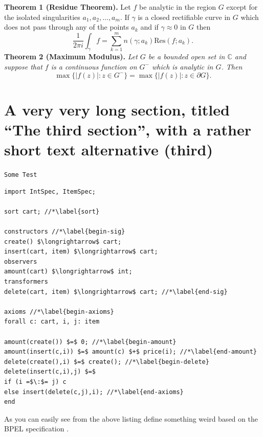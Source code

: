 \documentclass[mscthesis]{usiinfthesis}
\begin{document}
\textbf{Theorem 1 (Residue Theorem).}
Let $f$ be analytic in the region $G$ except for the isolated singularities $a_1,a_2,\ldots,a_m$. If $\gamma$ is a closed rectifiable curve in $G$ which does not pass through any of the points $a_k$ and if $\gamma\approx 0$ in $G$ then
\[
\frac{1}{2\pi i}\int_\gamma f = \sum_{k=1}^m n(\gamma;a_k) \text{Res}(f;a_k).
\]
\textbf{Theorem 2 (Maximum Modulus).}
\emph{Let $G$ be a bounded open set in $\mathbb{C}$ and suppose that $f$ is a continuous function on $G^-$ which is analytic in $G$. Then}
\[
\max\{|f(z)|:z\in G^-\}=\max \{|f(z)|:z\in \partial G \}.
\]

\section[third]{A very very long section, titled ``The third section'', with
  a rather  short text alternative (third)}
\lipsum \texttt{Some Test}
\begin{lstlisting}
import IntSpec, ItemSpec;

sort cart; //*\label{sort}

constructors //*\label{begin-sig}
create() $\longrightarrow$ cart;
insert(cart, item) $\longrightarrow$ cart;
observers
amount(cart) $\longrightarrow$ int;
transformers
delete(cart, item) $\longrightarrow$ cart; //*\label{end-sig}

axioms //*\label{begin-axioms}
forall c: cart, i, j: item 

amount(create()) $=$ 0; //*\label{begin-amount}
amount(insert(c,i)) $=$ amount(c) $+$ price(i); //*\label{end-amount}
delete(create(),i) $=$ create(); //*\label{begin-delete}
delete(insert(c,i),j) $=$
if (i =$\:$= j) c
else insert(delete(c,j),i); //*\label{end-axioms}
end
\end{lstlisting}

As you can easily see from the above listing \citet{bbggs:iet07}
define something weird based on the BPEL specification
\citep{bpelspec}.
\nocite{*}


%
%

%
%



\end{document}
